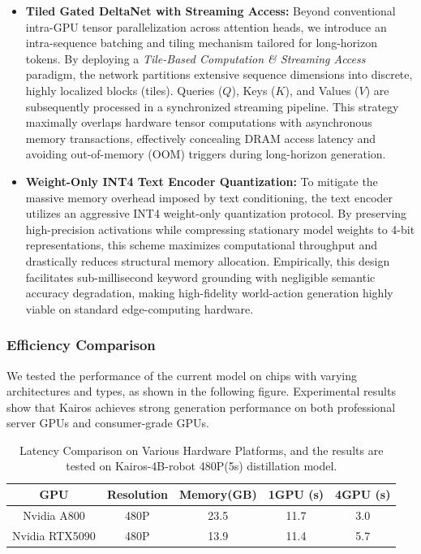 \documentclass{llmxive}
\begin{document}
\begin{itemize}

    \item \textbf{Tiled Gated DeltaNet with Streaming Access:} Beyond conventional intra-GPU tensor parallelization across attention heads, we introduce an intra-sequence batching and tiling mechanism tailored for long-horizon tokens. By deploying a \textit{Tile-Based Computation \& Streaming Access} paradigm, the network partitions extensive sequence dimensions into discrete, highly localized blocks (tiles). Queries ($Q$), Keys ($K$), and Values ($V$) are subsequently processed in a synchronized streaming pipeline. This strategy maximally overlaps hardware tensor computations with asynchronous memory transactions, effectively concealing DRAM access latency and avoiding out-of-memory (OOM) triggers during long-horizon generation.
	
    \item \textbf{Weight-Only INT4 Text Encoder Quantization:} To mitigate the massive memory overhead imposed by text conditioning, the text encoder utilizes an aggressive INT4 weight-only quantization protocol. By preserving high-precision activations while compressing stationary model weights to 4-bit representations, this scheme maximizes computational throughput and drastically reduces structural memory allocation. Empirically, this design facilitates sub-millisecond keyword grounding with negligible semantic accuracy degradation, making high-fidelity world-action generation highly viable on standard edge-computing hardware.

\end{itemize}

\subsubsection{Efficiency Comparison}
We tested the performance of the current model on chips with varying architectures and types, as shown in the following figure. Experimental results show that Kairos achieves strong generation performance on both professional server GPUs and consumer-grade GPUs. 
\begin{table}[!htbp]
\centering
\footnotesize
\begin{tabular}{ccccc}
\toprule
\textbf{GPU} & \textbf{Resolution} & \textbf{Memory(GB)} & \textbf{1GPU (s)} & \textbf{4GPU (s)} \\
\midrule
Nvidia A800  & 480P                & 23.5                & 11.7               & 3.0                \\
Nvidia RTX5090 & 480P              & 13.9                & 11.4               & 5.7                \\
\bottomrule
\end{tabular}
\vspace{0.3em}
\linebreak
\caption{Latency Comparison on Various Hardware Platforms, and the results are tested on Kairos-4B-robot 480P(5s) distillation model.
}
\label{tab:different hardware}
\end{table}
\end{document}
